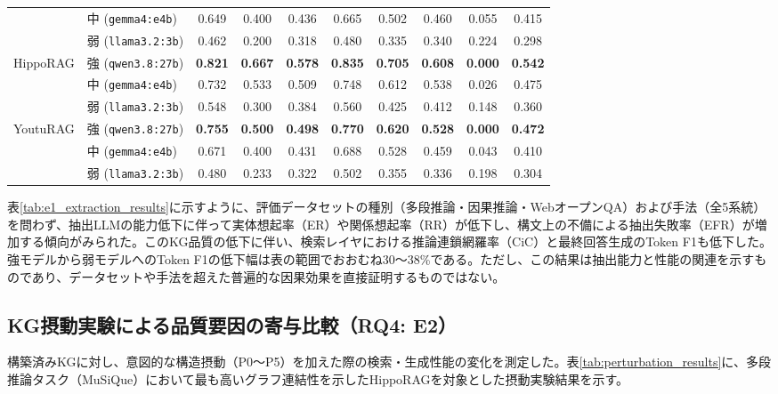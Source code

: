 \documentclass[a4j,dvipdfmx]{jsarticle}
\begin{document}
\begin{table}[t]
{\begin{tabular}{l|l|ccc|ccc|cc}
 & 中 (\texttt{gemma4:e4b})  & 0.649 & 0.400 & 0.436 & 0.665 & 0.502 & 0.460 & 0.055 & 0.415 \\
 & 弱 (\texttt{llama3.2:3b})  & 0.462 & 0.200 & 0.318 & 0.480 & 0.335 & 0.340 & 0.224 & 0.298 \\
\hline
\multirow{3}{*}{HippoRAG} 
 & 強 (\texttt{qwen3.8:27b})  & \textbf{0.821} & \textbf{0.667} & \textbf{0.578} & \textbf{0.835} & \textbf{0.705} & \textbf{0.608} & \textbf{0.000} & \textbf{0.542} \\
 & 中 (\texttt{gemma4:e4b})  & 0.732 & 0.533 & 0.509 & 0.748 & 0.612 & 0.538 & 0.026 & 0.475 \\
 & 弱 (\texttt{llama3.2:3b})  & 0.548 & 0.300 & 0.384 & 0.560 & 0.425 & 0.412 & 0.148 & 0.360 \\
\hline
\multirow{3}{*}{YoutuRAG}
 & 強 (\texttt{qwen3.8:27b})  & \textbf{0.755} & \textbf{0.500} & \textbf{0.498} & \textbf{0.770} & \textbf{0.620} & \textbf{0.528} & \textbf{0.000} & \textbf{0.472} \\
 & 中 (\texttt{gemma4:e4b})  & 0.671 & 0.400 & 0.431 & 0.688 & 0.528 & 0.459 & 0.043 & 0.410 \\
 & 弱 (\texttt{llama3.2:3b})  & 0.480 & 0.233 & 0.322 & 0.502 & 0.355 & 0.336 & 0.198 & 0.304 \\
\hline
\end{tabular}
}
\end{table}

表\ref{tab:e1_extraction_results}に示すように、評価データセットの種別（多段推論・因果推論・WebオープンQA）および手法（全5系統）を問わず、抽出LLMの能力低下に伴って実体想起率（ER）や関係想起率（RR）が低下し、構文上の不備による抽出失敗率（EFR）が増加する傾向がみられた。このKG品質の低下に伴い、検索レイヤにおける推論連鎖網羅率（CiC）と最終回答生成のToken F1も低下した。強モデルから弱モデルへのToken F1の低下幅は表の範囲でおおむね30〜38\%である。ただし、この結果は抽出能力と性能の関連を示すものであり、データセットや手法を超えた普遍的な因果効果を直接証明するものではない。

\subsection{KG摂動実験による品質要因の寄与比較（RQ4: E2）}
構築済みKGに対し、意図的な構造摂動（P0〜P5）を加えた際の検索・生成性能の変化を測定した。表\ref{tab:perturbation_results}に、多段推論タスク（MuSiQue）において最も高いグラフ連結性を示したHippoRAGを対象とした摂動実験結果を示す。
\end{document}
